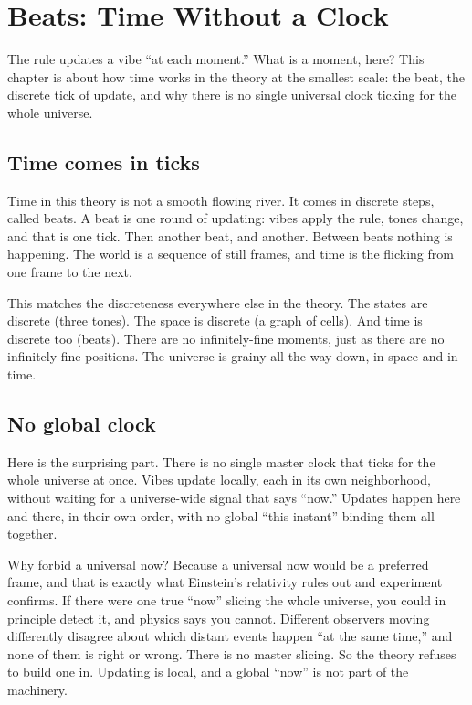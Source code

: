 \section{Beats: Time Without a Clock}

The rule updates a vibe ``at each moment.'' What is a moment, here? This chapter is about how time works in the theory at the smallest scale: the beat, the discrete tick of update, and why there is no single universal clock ticking for the whole universe.

\subsection{Time comes in ticks}

Time in this theory is not a smooth flowing river. It comes in discrete steps, called beats. A beat is one round of updating: vibes apply the rule, tones change, and that is one tick. Then another beat, and another. Between beats nothing is happening. The world is a sequence of still frames, and time is the flicking from one frame to the next.

This matches the discreteness everywhere else in the theory. The states are discrete (three tones). The space is discrete (a graph of cells). And time is discrete too (beats). There are no infinitely-fine moments, just as there are no infinitely-fine positions. The universe is grainy all the way down, in space and in time.

\subsection{No global clock}

Here is the surprising part. There is no single master clock that ticks for the whole universe at once. Vibes update locally, each in its own neighborhood, without waiting for a universe-wide signal that says ``now.'' Updates happen here and there, in their own order, with no global ``this instant'' binding them all together.

Why forbid a universal now? Because a universal now would be a preferred frame, and that is exactly what Einstein's relativity rules out and experiment confirms. If there were one true ``now'' slicing the whole universe, you could in principle detect it, and physics says you cannot. Different observers moving differently disagree about which distant events happen ``at the same time,'' and none of them is right or wrong. There is no master slicing. So the theory refuses to build one in. Updating is local, and a global ``now'' is not part of the machinery.

